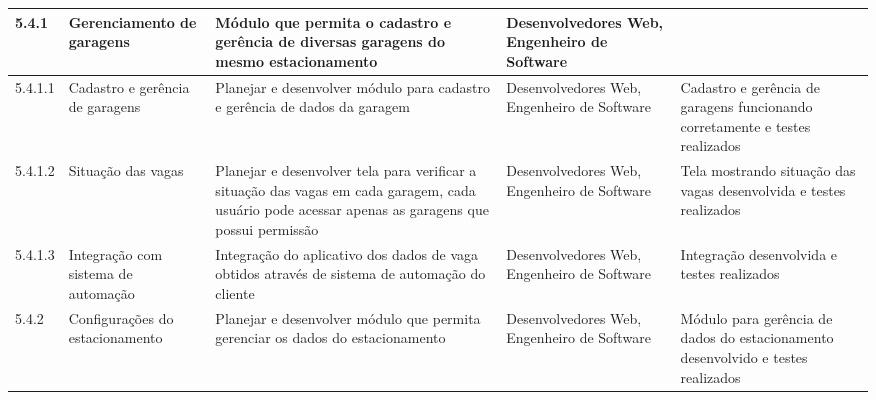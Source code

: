 \begin{landscape}
\begin{longtable}{@{\extracolsep{\fill}}  l  p{}  p{}  p{}  p{}  }
		\midrule
		5.4.1                  & Gerenciamento de garagens                                & Módulo que permita o cadastro e gerência de diversas garagens do mesmo estacionamento                                                                                          & Desenvolvedores Web, Engenheiro de Software                                                      &                                                                                                          \\*
		\midrule
		5.4.1.1                & Cadastro e gerência de garagens                         & Planejar e desenvolver módulo para cadastro e gerência de dados da garagem                                                                                                     & Desenvolvedores Web, Engenheiro de Software                                                      & Cadastro e gerência de garagens funcionando corretamente e testes realizados                            \\*
		\midrule
		5.4.1.2                & Situação das vagas                                     & Planejar e desenvolver tela para verificar a situação das vagas em cada garagem, cada usuário pode acessar apenas as garagens que possui permissão                           & Desenvolvedores Web, Engenheiro de Software                                                      & Tela mostrando situação das vagas desenvolvida e testes realizados                                     \\*
		\midrule
		5.4.1.3                & Integração com sistema de automação                  & Integração do aplicativo dos dados de vaga obtidos através de sistema de automação do cliente                                                                               & Desenvolvedores Web, Engenheiro de Software                                                      & Integração desenvolvida e testes realizados                                                            \\*
		\midrule
		5.4.2                  & Configurações do estacionamento                        & Planejar e desenvolver módulo que permita gerenciar os dados do estacionamento                                                                                                  & Desenvolvedores Web, Engenheiro de Software                                                      & Módulo para gerência de dados do estacionamento desenvolvido e testes realizados                       \\*
		\midrule

\end{longtable}
\end{landscape}
